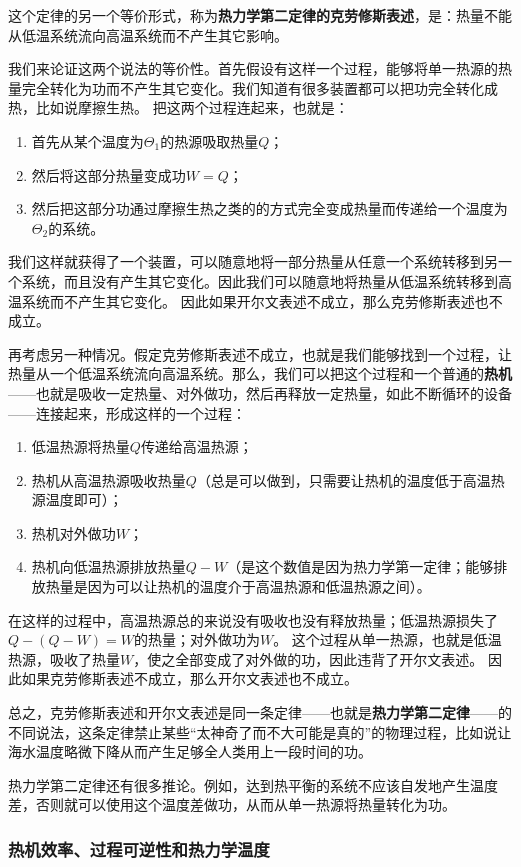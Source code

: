 \documentclass[hyperref, UTF8, a4paper]{ctexart}
\begin{document}
这个定律的另一个等价形式，称为\textbf{热力学第二定律的克劳修斯表述}，是：热量不能从低温系统流向高温系统而不产生其它影响。

我们来论证这两个说法的等价性。首先假设有这样一个过程，能够将单一热源的热量完全转化为功而不产生其它变化。我们知道有很多装置都可以把功完全转化成热，比如说摩擦生热。
把这两个过程连起来，也就是：
\begin{enumerate}
    \item 首先从某个温度为$\Theta_1$的热源吸取热量$Q$；
    \item 然后将这部分热量变成功$W=Q$；
    \item 然后把这部分功通过摩擦生热之类的的方式完全变成热量而传递给一个温度为$\Theta_2$的系统。
\end{enumerate}
我们这样就获得了一个装置，可以随意地将一部分热量从任意一个系统转移到另一个系统，而且没有产生其它变化。因此我们可以随意地将热量从低温系统转移到高温系统而不产生其它变化。
因此如果开尔文表述不成立，那么克劳修斯表述也不成立。

再考虑另一种情况。假定克劳修斯表述不成立，也就是我们能够找到一个过程，让热量从一个低温系统流向高温系统。那么，我们可以把这个过程和一个普通的\textbf{热机}——也就是吸收一定热量、对外做功，然后再释放一定热量，如此不断循环的设备——连接起来，形成这样的一个过程：
\begin{enumerate}
    \item 低温热源将热量$Q$传递给高温热源；
    \item 热机从高温热源吸收热量$Q$（总是可以做到，只需要让热机的温度低于高温热源温度即可）；
    \item 热机对外做功$W$；
    \item 热机向低温热源排放热量$Q-W$（是这个数值是因为热力学第一定律；能够排放热量是因为可以让热机的温度介于高温热源和低温热源之间）。
\end{enumerate}
在这样的过程中，高温热源总的来说没有吸收也没有释放热量；低温热源损失了$Q-(Q-W)=W$的热量；对外做功为$W$。
这个过程从单一热源，也就是低温热源，吸收了热量$W$，使之全部变成了对外做的功，因此违背了开尔文表述。
因此如果克劳修斯表述不成立，那么开尔文表述也不成立。

总之，克劳修斯表述和开尔文表述是同一条定律——也就是\textbf{热力学第二定律}——的不同说法，这条定律禁止某些“太神奇了而不大可能是真的”的物理过程，比如说让海水温度略微下降从而产生足够全人类用上一段时间的功。

热力学第二定律还有很多推论。例如，达到热平衡的系统不应该自发地产生温度差，否则就可以使用这个温度差做功，从而从单一热源将热量转化为功。

\subsubsection{热机效率、过程可逆性和热力学温度}
\end{document}
